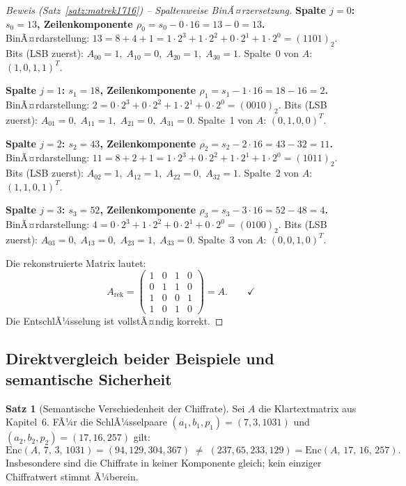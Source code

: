 ﻿\documentclass[a4paper,12pt]{scrreprt}
\theoremstyle{definition}
\newtheorem{satz}{Satz}[section]
\begin{document}
\begin{proof}[Beweis (Satz~\ref{satz:matrek1716}) -- Spaltenweise BinÃ¤rzersetzung]

\medskip\noindent\textbf{Spalte $j=0$: $s_0 = 13$, Zeilenkomponente $\rho_0 = s_0 - 0 \cdot 16 = 13 - 0 = 13$.}\\
BinÃ¤rdarstellung: $13 = 8 + 4 + 1 = 1 \cdot 2^3 + 1 \cdot 2^2 + 0 \cdot 2^1 + 1 \cdot 2^0 = (1101)_2$.
Bits (LSB zuerst): $A_{00}=1,\; A_{10}=0,\; A_{20}=1,\; A_{30}=1$.
Spalte~0 von $A$: $(1,0,1,1)^T$. \checkmark

\medskip\noindent\textbf{Spalte $j=1$: $s_1 = 18$, Zeilenkomponente $\rho_1 = s_1 - 1 \cdot 16 = 18 - 16 = 2$.}\\
BinÃ¤rdarstellung: $2 = 0 \cdot 2^3 + 0 \cdot 2^2 + 1 \cdot 2^1 + 0 \cdot 2^0 = (0010)_2$.
Bits (LSB zuerst): $A_{01}=0,\; A_{11}=1,\; A_{21}=0,\; A_{31}=0$.
Spalte~1 von $A$: $(0,1,0,0)^T$. \checkmark

\medskip\noindent\textbf{Spalte $j=2$: $s_2 = 43$, Zeilenkomponente $\rho_2 = s_2 - 2 \cdot 16 = 43 - 32 = 11$.}\\
BinÃ¤rdarstellung: $11 = 8 + 2 + 1 = 1 \cdot 2^3 + 0 \cdot 2^2 + 1 \cdot 2^1 + 1 \cdot 2^0 = (1011)_2$.
Bits (LSB zuerst): $A_{02}=1,\; A_{12}=1,\; A_{22}=0,\; A_{32}=1$.
Spalte~2 von $A$: $(1,1,0,1)^T$. \checkmark

\medskip\noindent\textbf{Spalte $j=3$: $s_3 = 52$, Zeilenkomponente $\rho_3 = s_3 - 3 \cdot 16 = 52 - 48 = 4$.}\\
BinÃ¤rdarstellung: $4 = 0 \cdot 2^3 + 1 \cdot 2^2 + 0 \cdot 2^1 + 0 \cdot 2^0 = (0100)_2$.
Bits (LSB zuerst): $A_{03}=0,\; A_{13}=0,\; A_{23}=1,\; A_{33}=0$.
Spalte~3 von $A$: $(0,0,1,0)^T$. \checkmark

Die rekonstruierte Matrix lautet:
\[
A_{\mathrm{rek}} = \begin{pmatrix} 1 & 0 & 1 & 0 \\ 0 & 1 & 1 & 0 \\ 1 & 0 & 0 & 1 \\ 1 & 0 & 1 & 0 \end{pmatrix} = A. \qquad \checkmark
\]
Die EntschlÃ¼sselung ist vollstÃ¤ndig korrekt.
\end{proof}

\subsection{Direktvergleich beider Beispiele und semantische Sicherheit}

\begin{satz}[Semantische Verschiedenheit der Chiffrate]
\label{satz:semsec}
Sei $A$ die Klartextmatrix aus Kapitel~6. FÃ¼r die SchlÃ¼sselpaare $(a_1, b_1, p_1) = (7, 3, 1031)$ und $(a_2, b_2, p_2) = (17, 16, 257)$ gilt:
\[
\mathrm{Enc}(A,\, 7,\, 3,\, 1031) = (94, 129, 304, 367) \;\neq\; (237, 65, 233, 129) = \mathrm{Enc}(A,\, 17,\, 16,\, 257).
\]
Insbesondere sind die Chiffrate in keiner Komponente gleich; kein einziger Chiffratwert stimmt Ã¼berein.
\end{satz}
\end{document}
